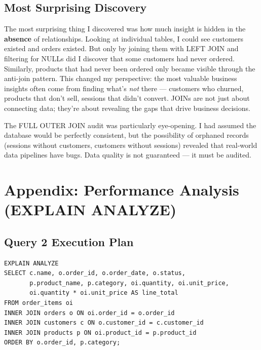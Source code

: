 \documentclass[12pt,a4paper]{article}
\begin{document}
\subsection*{Most Surprising Discovery}

The most surprising thing I discovered was how much insight is hidden in the
\textbf{absence} of relationships. Looking at individual tables, I could see
customers existed and orders existed. But only by joining them with LEFT JOIN
and filtering for NULLs did I discover that some customers had never ordered.
Similarly, products that had never been ordered only became visible through the
anti-join pattern. This changed my perspective: the most valuable business insights
often come from finding what's \textit{not} there — customers who churned, products
that don't sell, sessions that didn't convert. JOINs are not just about connecting
data; they're about revealing the gaps that drive business decisions.

The FULL OUTER JOIN audit was particularly eye-opening. I had assumed the database
would be perfectly consistent, but the possibility of orphaned records (sessions
without customers, customers without sessions) revealed that real-world data
pipelines have bugs. Data quality is not guaranteed — it must be audited.

\newpage
\section*{Appendix: Performance Analysis (EXPLAIN ANALYZE)}

\subsection*{Query 2 Execution Plan}

\begin{lstlisting}[caption={EXPLAIN ANALYZE for Query 2}]
EXPLAIN ANALYZE
SELECT c.name, o.order_id, o.order_date, o.status,
       p.product_name, p.category, oi.quantity, oi.unit_price,
       oi.quantity * oi.unit_price AS line_total
FROM order_items oi
INNER JOIN orders o ON oi.order_id = o.order_id
INNER JOIN customers c ON o.customer_id = c.customer_id
INNER JOIN products p ON oi.product_id = p.product_id
ORDER BY o.order_id, p.category;
\end{lstlisting}
\end{document}
